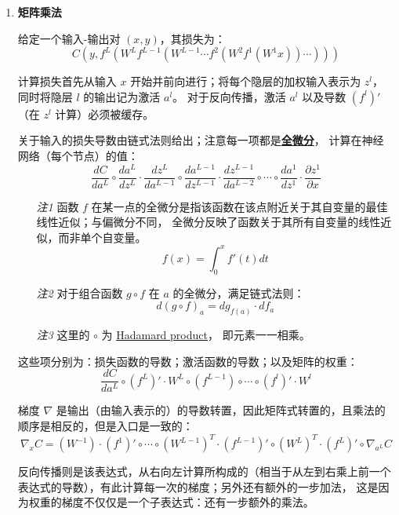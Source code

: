 \documentclass[../studies-ml.tex]{subfiles}
\begin{document}
\begin{enumerate}[I]
  \item \textbf{矩阵乘法}

        给定一个输入-输出对 $(x,y)$，其损失为：
        \[ C(y, f^L(W^L f^{L-1}(W^{L-1} \cdots f^2(W^2 f^1(W^1 x)) \cdots))) \]

        计算损失首先从输入 $x$ 开始并前向进行；将每个隐层的加权输入表示为 $z^l$，同时将隐层 $l$ 的输出记为激活 $a^l$。
        对于反向传播，激活 $a^l$ 以及导数 $(f^l)'$（在 $z^l$ 计算）必须被缓存。

        关于输入的损失导数由链式法则给出；注意每一项都是\href{https://en.wikipedia.org/wiki/Total_derivative}{\textbf{全微分}}，
        计算在神经网络（每个节点）的值：
        \[
          \frac{dC}{da^L} \circ \frac{da^L}{dz^L} \cdot \frac{dz^L}{da^{L-1}} \circ \frac{da^{L-1}}{dz^{L-1}}
          \cdot \frac{dz^{L-1}}{da^{L-2}} \circ \cdots \circ \frac{da^1}{dz^1} \cdot
          \frac{\partial z^1}{\partial x}
        \]

        \begin{itemize}
          \item [\textit{注1}]
                函数 $f$ 在某一点的全微分是指该函数在该点附近关于其自变量的最佳线性近似；与偏微分不同，
                全微分反映了函数关于其所有自变量的线性近似，而非单个自变量。
                \[ f(x) = \int_0^x f'(t) dt \]
          \item [\textit{注2}]
                对于组合函数 $g \circ f$ 在 $a$ 的全微分，满足链式法则：
                \[ d(g \circ f)_a = dg_{f(a)} \cdot df_a \]
          \item [\textit{注3}]
                这里的 $\circ$ 为 \href{https://en.wikipedia.org/wiki/Hadamard_product_(matrices)}{Hadamard product}，
                即元素一一相乘。
        \end{itemize}

        这些项分别为：损失函数的导数；激活函数的导数；以及矩阵的权重：
        \[
          \frac{dC}{da^L} \circ (f^L)' \cdot W^L \circ (f^{L-1}) \circ \cdots \circ (f^l)' \cdot W^l
        \]

        梯度 $\nabla$ 是输出（由输入表示的）的导数转置，因此矩阵式转置的，且乘法的顺序是相反的，但是入口是一致的：
        \[
          \nabla_x C = (W^{-1}) \cdot (f^1)' \circ \cdots \circ (W^{L-1})^T \cdot (f^{L-1})' \circ (W^L)^T
          \cdot (f^L)' \circ \nabla_{a^L} C
        \]

        反向传播则是该表达式，从右向左计算所构成的（相当于从左到右乘上前一个表达式的导数），有此计算每一次的梯度；另外还有额外的一步加法，
        这是因为权重的梯度不仅仅是一个子表达式：还有一步额外的乘法。


\end{enumerate}
\end{document}
